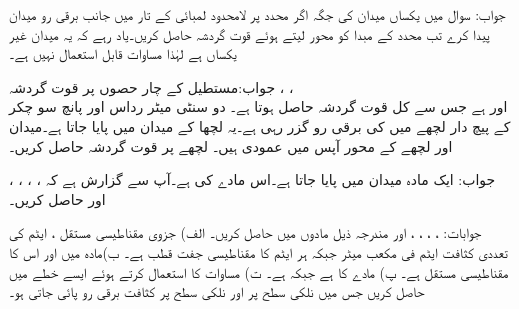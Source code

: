جواب:
سوال  میں یکساں میدان کی جگہ اگر  محدد پر لامحدود لمبائی کے تار میں  جانب  برقی رو میدان پیدا کرے تب محدد کے مبدا  کو محور لیتے ہوئے قوت گردشہ حاصل کریں۔یاد رہے کہ یہ میدان غیر یکساں ہے لہٰذا مساوات   قابل استعمال نہیں ہے۔

جواب:مستطیل کے چار حصوں پر قوت گردشہ ، ، \\
 اور   ہے جس سے کل قوت گردشہ   حاصل ہوتا ہے۔
دو سنٹی میٹر رداس اور پانچ سو چکر کے پیچ دار لچھے میں  کی برقی رو گزر رہی ہے۔یہ لچھا  کے میدان میں پایا جاتا ہے۔میدان اور لچھے کے محور آپس میں عمودی ہیں۔ لچھے پر قوت گردشہ حاصل کریں۔

جواب:
ایک مادہ  میدان  میں پایا جاتا ہے۔اس مادے کی  ہے۔آپ سے گزارش ہے کہ ، ، ،  ، اور  حاصل کریں۔

جوابات: ، ، ، ،  اور 
مندرجہ ذیل مادوں میں  حاصل کریں۔ الف) جزوی مقناطیسی مستقل ، ایٹم کی تعددی کثافت  ایٹم فی مکعب میٹر جبکہ ہر ایٹم کا مقناطیسی جفت قطب  ہے۔ ب)مادہ میں  اور  اس کا مقناطیسی مستقل  ہے۔ پ) مادے کا  ہے جبکہ  ہے۔ ت) مساوات  کا استعمال کرتے ہوئے  ایسے خطے میں  حاصل کریں جس میں نلکی سطح  پر  اور نلکی سطح  پر  کثافت برقی رو پائی جاتی ہو۔

